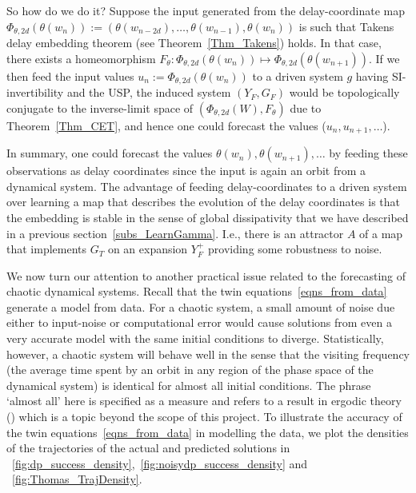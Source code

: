 So how do we do it? Suppose the input generated from the delay-coordinate map $\Phi_{\theta,2d}(\theta(w_{n})) := (\theta(w_{n-2d}),\ldots,\theta(w_{n-1}),\theta(w_{n}))$ is such that Takens delay embedding theorem (see Theorem~\ref{Thm_Takens}) holds.
In that case, there exists a homeomorphism  $F_\theta: \Phi_{\theta,2d}(\theta(w_{n})) \mapsto \Phi_{\theta,2d}(\theta(w_{n+1}))$. If we then feed the input values $u_n := \Phi_{\theta,2d}(\theta(w_{n}))$ to a driven system $g$ having SI-invertibility and the USP, the induced system $(Y_F,G_F)$ would be topologically conjugate to the inverse-limit space of
$(\Phi_{\theta,2d}(W), F_\theta)$ due to Theorem~\ref{Thm_CET}, and hence one could forecast the values ($u_n,u_{n+1},\ldots$). 

In summary, one could forecast  the values $\theta(w_n), \theta(w_{n+1}),\ldots$ by feeding these observations as delay coordinates since the input is again an orbit from a dynamical system. 
The advantage of feeding delay-coordinates to a driven system over learning a map that describes the evolution of the delay coordinates is that the embedding is stable in the sense of global dissipativity that we have described in a previous section~\ref{subs_LearnGamma}.
I.e., there is an attractor $A$ of a map that implements $G_T$ on an expansion $Y_F^+$ providing some robustness to noise. 

We now turn our attention to another practical issue related to the forecasting of chaotic dynamical systems.  
Recall that the twin equations~\ref{eqns_from_data} generate a model from data. 
For a chaotic system, a small amount of noise due either to input-noise or computational error would cause solutions from even a very accurate model with the same initial conditions to diverge. %
Statistically, however,  a chaotic system will behave well in the sense that the visiting frequency (the average time spent by an orbit in any region of the phase space of the dynamical system) is identical for almost all initial conditions. 
The phrase `almost all' here is specified as a measure and refers to a result in ergodic theory (\cite{wikiErgodicTheory}) which is a topic beyond the scope of this project.
To illustrate the accuracy of the twin  equations~\ref{eqns_from_data} in modelling the data, we plot the densities of the trajectories of the actual and predicted solutions in ~\ref{fig:dp_success_density},~\ref{fig:noisydp_success_density} and ~\ref{fig:Thomas_TrajDensity}.

